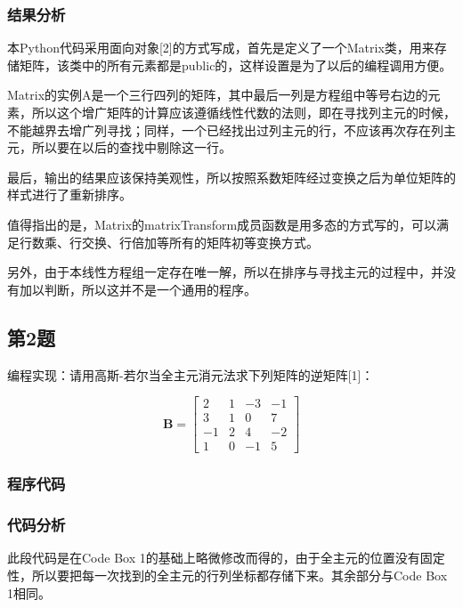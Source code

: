 \documentclass[UTF8, a4paper, zihao=-4, bibliography=totoc]{ctexart}
\begin{document}
\subsubsection{结果分析}

本Python代码采用面向对象[2]的方式写成，首先是定义了一个Matrix类，用来存储矩阵，该类中的所有元素都是public的，这样设置是为了以后的编程调用方便。

Matrix的实例A是一个三行四列的矩阵，其中最后一列是方程组中等号右边的元素，所以这个增广矩阵的计算应该遵循线性代数的法则，即在寻找列主元的时候，不能越界去增广列寻找；同样，一个已经找出过列主元的行，不应该再次存在列主元，所以要在以后的查找中剔除这一行。

最后，输出的结果应该保持美观性，所以按照系数矩阵经过变换之后为单位矩阵的样式进行了重新排序。

值得指出的是，Matrix的matrixTransform成员函数是用多态的方式写的，可以满足行数乘、行交换、行倍加等所有的矩阵初等变换方式。

另外，由于本线性方程组一定存在唯一解，所以在排序与寻找主元的过程中，并没有加以判断，所以这并不是一个通用的程序。

\subsection{第2题}

编程实现：请用高斯-若尔当全主元消元法求下列矩阵的逆矩阵[1]：

\begin{equation}
    \mathbf{B} = \left[\begin{array}{rrrr}
        {2} & {1} & {-3} & {-1} \\
        {3} & {1} & {0} & {7} \\
        {-1} & {2} & {4} & {-2} \\
        {1} & {0} & {-1} & {5}
    \end{array}\right]
\end{equation}

\subsubsection{程序代码}


\subsubsection{代码分析}
此段代码是在Code Box 1的基础上略微修改而得的，由于全主元的位置没有固定性，所以要把每一次找到的全主元的行列坐标都存储下来。其余部分与Code Box 1相同。
\end{document}
